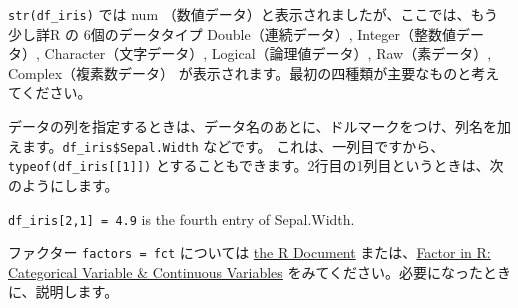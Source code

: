 \documentclass[
  xelatex, ja=standard]{bxjsbook}
\newenvironment{Shaded}{\begin{snugshade}}{\end{snugshade}}
\newcommand{\CommentTok}[1]{\textcolor[rgb]{0.56,0.35,0.01}{\textit{#1}}}
\newcommand{\FunctionTok}[1]{\textcolor[rgb]{0.13,0.29,0.53}{\textbf{#1}}}
\newcommand{\NormalTok}[1]{#1}
\newcommand{\SpecialCharTok}[1]{\textcolor[rgb]{0.81,0.36,0.00}{\textbf{#1}}}
\theoremstyle{definition}
\theoremstyle{definition}
\theoremstyle{definition}
\theoremstyle{definition}
\theoremstyle{remark}
\begin{document}
\texttt{str(df\_iris)} では num （数値データ）と表示されましたが、ここでは、もう少し詳R の 6個のデータタイプ Double（連続データ）, Integer（整数値データ）, Character（文字データ）, Logical（論理値データ）, Raw（素データ）, Complex（複素数データ） が表示されます。最初の四種類が主要なものと考えてください。

データの列を指定するときは、データ名のあとに、ドルマークをつけ、列名を加えます。\texttt{df\_iris\$Sepal.Width} などです。 これは、一列目ですから、 \texttt{typeof(df\_iris{[}{[}1{]}{]})} とすることもできます。2行目の1列目というときは、次のようにします。

\texttt{df\_iris{[}2,1{]}\ =\ 4.9} is the fourth entry of Sepal.Width.

\begin{Shaded}
\end{Shaded}

\begin{Shaded}
\end{Shaded}

\begin{Shaded}
\end{Shaded}

ファクター \texttt{factors\ =\ fct} については \href{https://www.rdocumentation.org/packages/base/versions/3.6.2/topics/factor}{the R Document} または、\href{https://www.guru99.com/r-factor-categorical-continuous.html}{Factor in R: Categorical Variable \& Continuous Variables} をみてください。必要になったときに、説明します。

\begin{Shaded}
\end{Shaded}
\end{document}
